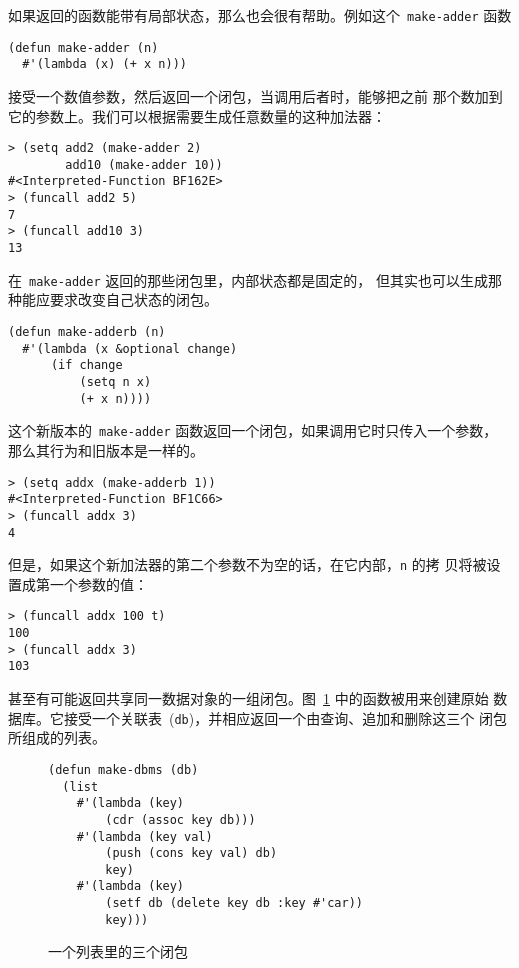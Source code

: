 如果返回的函数能带有局部状态，那么也会很有帮助。例如这个~\verb|make-adder| 函数
\begin{lstlisting}
(defun make-adder (n)
  #'(lambda (x) (+ x n)))
\end{lstlisting}
\label{fun:make-adder} 接受一个数值参数，然后返回一个闭包，当调用后者时，能够把之前
那个数加到它的参数上。我们可以根据需要生成任意数量的这种加法器：
\begin{lstlisting}
> (setq add2 (make-adder 2)
        add10 (make-adder 10))
#<Interpreted-Function BF162E>
> (funcall add2 5)
7
> (funcall add10 3)
13
\end{lstlisting}
在~\verb|make-adder| 返回的那些闭包里，内部状态都是固定的，
但其实也可以生成那种能应要求改变自己状态的闭包。
\begin{lstlisting}
(defun make-adderb (n)
  #'(lambda (x &optional change)
      (if change
          (setq n x)
          (+ x n))))
\end{lstlisting}
这个新版本的~\verb|make-adder| 函数返回一个闭包，如果调用它时只传入一个参数，
那么其行为和旧版本是一样的。
\begin{lstlisting}
> (setq addx (make-adderb 1))
#<Interpreted-Function BF1C66>
> (funcall addx 3)
4
\end{lstlisting}
但是，如果这个新加法器的第二个参数不为空的话，在它内部，\verb|n| 的拷
贝将被设置成第一个参数的值：
\begin{lstlisting}
> (funcall addx 100 t)
100
> (funcall addx 3)
103
\end{lstlisting}

甚至有可能返回共享同一数据对象的一组闭包。图~\ref{fig:make-dbms} 中的函数被用来创建原始
数据库。它接受一个关联表~(\verb|db|)，并相应返回一个由查询、追加和删除这三个
闭包所组成的列表。

\begin{figure}
\begin{lstlisting}
(defun make-dbms (db)
  (list
    #'(lambda (key)
        (cdr (assoc key db)))
    #'(lambda (key val)
        (push (cons key val) db)
        key)
    #'(lambda (key)
        (setf db (delete key db :key #'car))
        key)))
\end{lstlisting}
  \caption{一个列表里的三个闭包}
  \label{fig:make-dbms}
\end{figure}

